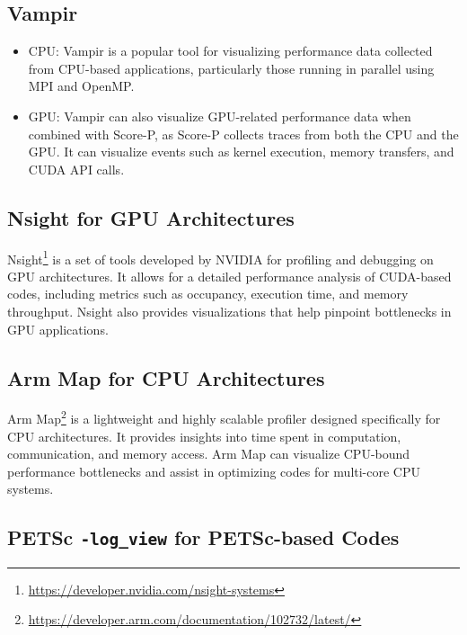 \subsection{Vampir}
\label{sec:methodology-tools-vampir}

\begin{itemize}
    \item CPU: Vampir is a popular tool for visualizing performance data collected from CPU-based applications, particularly those running in parallel using MPI and OpenMP.
    \item GPU: Vampir can also visualize GPU-related performance data when combined with Score-P, as Score-P collects traces from both the CPU and the GPU. It can visualize events such as kernel execution, memory transfers, and CUDA API calls.
\end{itemize}


\subsection{Nsight for GPU Architectures}
\label{sec:methodology-tools-nsight}

Nsight\footnote{\url{https://developer.nvidia.com/nsight-systems}} is a set of tools developed by NVIDIA for profiling and debugging on GPU architectures. 
It allows for a detailed performance analysis of CUDA-based codes, including metrics such as occupancy, execution time, and memory throughput.
Nsight also provides visualizations that help pinpoint bottlenecks in GPU applications.

\subsection{Arm Map for CPU Architectures}
\label{sec:methodology-tools-armmap}

Arm Map\footnote{\url{https://developer.arm.com/documentation/102732/latest/}} is a lightweight and highly scalable profiler designed specifically for CPU architectures. 
It provides insights into time spent in computation, communication, and memory access. 
Arm Map can visualize CPU-bound performance bottlenecks and assist in optimizing codes for multi-core CPU systems.

\subsection{PETSc \texttt{-log\_view} for PETSc-based Codes}
\label{sec:methodology-tools-petsc}

